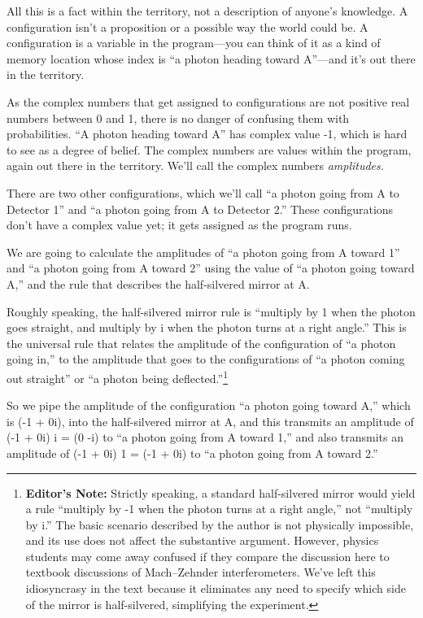 {
 All this is a fact within the territory, not a description of
anyone's knowledge. A configuration
isn't a proposition or a possible way the world could
be. A configuration is a variable in the program---you can think of it
as a kind of memory location whose index is ``a photon
heading toward A''---and it's out
there in the territory.}

{
 As the complex numbers that get assigned to configurations are not
positive real numbers between 0 and 1, there is no danger of confusing
them with probabilities. ``A photon heading toward
A'' has complex value -1, which is hard to see as a
degree of belief. The complex numbers are values within the program,
again out there in the territory. We'll call the
complex numbers \textit{amplitudes.}}

{
 There are two other configurations, which we'll
call ``a photon going from A to Detector
1'' and ``a photon going from A to
Detector 2.'' These configurations
don't have a complex value yet; it gets assigned as the
program runs.}

{
 We are going to calculate the amplitudes of ``a
photon going from A toward 1'' and
``a photon going from A toward 2''
using the value of ``a photon going toward
A,'' and the rule that describes the half-silvered
mirror at A.}

{
 Roughly speaking, the half-silvered mirror rule is
``multiply by 1 when the photon goes straight, and
multiply by i when the photon turns at a right
angle.'' This is the universal rule that relates the
amplitude of the configuration of ``a photon going
in,'' to the amplitude that goes to the
configurations of ``a photon coming out
straight'' or ``a photon being
deflected.''\footnote{\textbf{Editor's Note:} Strictly speaking, a
standard half-silvered mirror would yield a rule
``multiply by -1 when the photon turns at a right
angle,'' not ``multiply by
i.'' The basic scenario described by the author is
not physically impossible, and its use does not affect the substantive
argument. However, physics students may come away confused if they
compare the discussion here to textbook discussions of Mach--Zehnder
interferometers. We've left this idiosyncrasy in the
text because it eliminates any need to specify which side of the mirror
is half-silvered, simplifying the experiment.}}

{
 So we pipe the amplitude of the configuration ``a
photon going toward A,'' which is (-1 + 0i), into the
half-silvered mirror at A, and this transmits an amplitude of (-1 + 0i)
{\texttimes} i = (0 -i) to ``a photon going from A
toward 1,'' and also transmits an amplitude of (-1 +
0i) {\texttimes} 1 = (-1 + 0i) to ``a photon going
from A toward 2.''}

